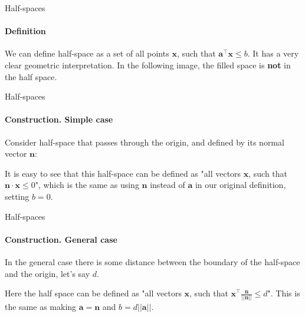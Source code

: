 \documentclass{beamer}
\begin{document}
\begin{frame}{Half-spaces}
\framesubtitle{Definition}
\begin{flushleft}

We can define half-space as a set of all points $\mathbf{x}$, such that $\mathbf{a}^\top \mathbf{x} \leq b$. It has a very clear geometric interpretation. In the following image, the filled space is \textbf{not} in the half space.


 
\end{flushleft}
\end{frame}



\begin{frame}{Half-spaces}
\framesubtitle{Construction. Simple case}
\begin{flushleft}

Consider half-space that passes through the origin, and defined by its normal vector $\mathbf{n}$:



It is easy to see that this half-space can be defined as "all vectors $\mathbf{x}$, such that $\mathbf{n} \cdot \mathbf{x} \leq 0$", which is the same as using $\mathbf{n}$ instead of $\mathbf{a}$ in our original definition, setting $b = 0$.
 
\end{flushleft}
\end{frame}




\begin{frame}{Half-spaces}
\framesubtitle{Construction. General case}
\begin{flushleft}

In the general case there is some distance between the boundary of the half-space and the origin, let's say $d$.


%
Here the half space can be defined as "all vectors $\mathbf{x}$, such that $\mathbf{x}^\top \frac{\mathbf{n}}{|| \mathbf{n} ||}  \leq d$". This is the same as making $\mathbf{a} = \mathbf{n}$ and $b = d ||\mathbf{a}||$.
 
\end{flushleft}
\end{frame}
\end{document}
